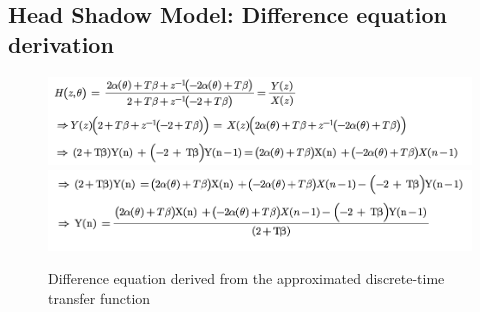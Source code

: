 \documentclass{assignment}
\begin{document}
\subsection{Head Shadow Model: Difference equation derivation}
\begin{figure}[h]
    \centering
    \includegraphics[scale=0.5]{assets/diff1.png}
    \includegraphics[scale=0.5]{assets/diff2.png}
    \caption{Difference equation derived from the approximated discrete-time transfer function}
    \label{fig:my_label}
\end{figure}
\end{document}
